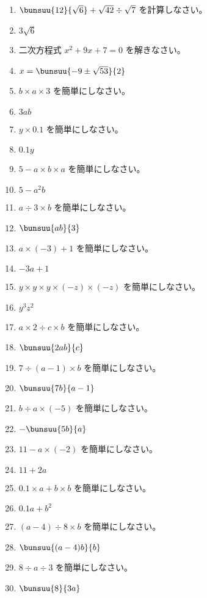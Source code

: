 \documentclass[uplatex,a4j,11pt]{jsreport}
\begin{document}
\begin{multicols}{2}
\begin{enumerate}
    \item $\bunsuu{12}{\sqrt{6}}+\sqrt{42}\div\sqrt{7}$ を計算しなさい。%
    \item $3\sqrt{6}$
    \item 二次方程式 $x^2+9x+7=0$ を解きなさい。%
    \item $x=\bunsuu{-9\pm\sqrt{53}}{2}$
    \item $b \times a \times 3$ を簡単にしなさい。%
    \item $3ab$
    \item $y \times 0.1$ を簡単にしなさい。%
    \item $0.1y$
    \item $5-a \times b \times a$ を簡単にしなさい。%
    \item $5-a^2b$
    \item $a \div 3 \times b$ を簡単にしなさい。%
    \item $\bunsuu{ab}{3}$
    \item $a \times (-3) + 1$ を簡単にしなさい。%
    \item $-3a+1$
    \item $y \times y \times y \times (-z) \times (-z)$ を簡単にしなさい。%
    \item $y^3z^2$
    \item $a \times 2 \div c \times b$ を簡単にしなさい。%
    \item $\bunsuu{2ab}{c}$
    \item $7 \div (a - 1) \times b$ を簡単にしなさい。%
    \item $\bunsuu{7b}{a-1}$
    \item $b \div a \times (-5)$ を簡単にしなさい。%
    \item $-\bunsuu{5b}{a}$
    \item $11-a\times(-2)$ を簡単にしなさい。%
    \item $11+2a$
    \item $0.1 \times a + b \times b$ を簡単にしなさい。%
    \item $0.1a+b^2$
    \item $(a - 4) \div 8 \times b$ を簡単にしなさい。%
    \item $\bunsuu{(a-4)b}{b}$
    \item $8 \div a \div 3$ を簡単にしなさい。%
    \item $\bunsuu{8}{3a}$

\end{enumerate}
\end{multicols}
\end{document}
